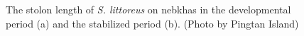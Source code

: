 \documentclass[]{interact}
\theoremstyle{plain}%
\theoremstyle{definition}
\theoremstyle{remark}
\begin{document}
\begin{figure}[!h]
  \centering
  \hspace{5pt}
  \caption{The stolon length of \textit{S. littoreus} on nebkhas in the developmental period (a) and the stabilized period (b). (Photo by Pingtan Island)} 
  \label{fig:added}
\end{figure}
\end{document}
